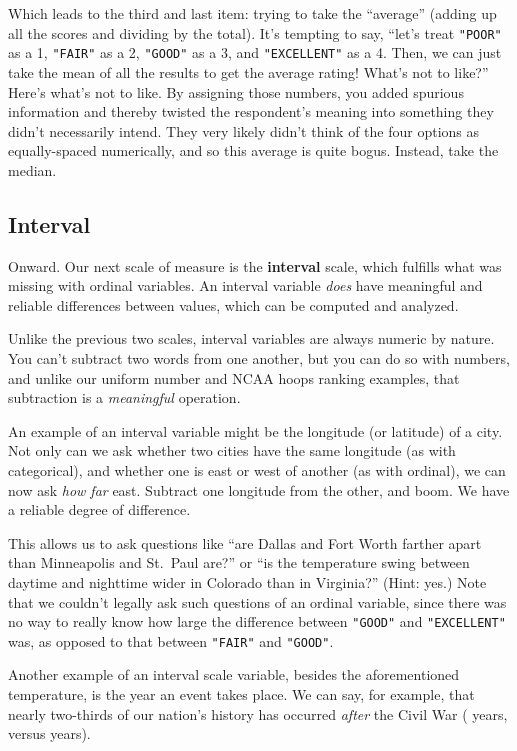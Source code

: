 Which leads to the third and last item: trying to take the ``average'' (adding
up all the scores and dividing by the total). It's tempting to say, ``let's
treat \texttt{"POOR"} as a 1, \texttt{"FAIR"} as a 2, \texttt{"GOOD"} as a 3,
and \texttt{"EXCELLENT"} as a 4. Then, we can just take the mean of all the
results to get the average rating! What's not to like?'' Here's what's not to
like. By assigning those numbers, you added spurious information and thereby
twisted the respondent's meaning into something they didn't necessarily intend.
They very likely didn't think of the four options as equally-spaced
numerically, and so this average is quite bogus. Instead, take the median.


\subsection{Interval}

Onward. Our next scale of measure is the \textbf{interval} scale, which
fulfills what was missing with ordinal variables. An interval variable
\textit{does} have meaningful and reliable differences between values, which
can be computed and analyzed.

Unlike the previous two scales, interval variables are always numeric by
nature. You can't subtract two words from one another, but you can do so with
numbers, and unlike our uniform number and NCAA hoops ranking examples, that
subtraction is a \textit{meaningful} operation.

An example of an interval variable might be the longitude (or latitude) of a
city. Not only can we ask whether two cities have the same longitude (as with
categorical), and whether one is east or west of another (as with ordinal), we
can now ask \textit{how far} east. Subtract one longitude from the other, and
boom. We have a reliable degree of difference.

This allows us to ask questions like ``are Dallas and Fort Worth farther apart
than Minneapolis and St.~Paul are?'' or ``is the temperature swing between
daytime and nighttime wider in Colorado than in Virginia?'' (Hint: yes.) Note
that we couldn't legally ask such questions of an ordinal variable, since there
was no way to really know how large the difference between \texttt{"GOOD"} and
\texttt{"EXCELLENT"} was, as opposed to that between \texttt{"FAIR"} and
\texttt{"GOOD"}.

Another example of an interval scale variable, besides the aforementioned
temperature, is the year an event takes place. We can say, for example, that
nearly two-thirds of our nation's history has occurred \textit{after} the Civil
War ( years, versus  years).

